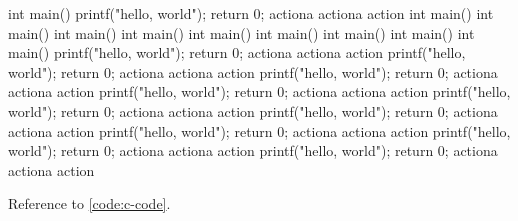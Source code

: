 \documentclass{article}
\newenvironment{codetitle}{\captionsetup{type=listing}}{}
\begin{document}
\begin{codetitle}
\label{code:c-code}
\begin{cppcode}
int main() {
printf("hello, world");
return 0;
actiona
actiona
action
}
int main() {
int main() {
int main() {
int main() {
int main() {
int main() {
int main() {
int main() {
int main() {
printf("hello, world");
return 0;
actiona
actiona
action
}
printf("hello, world");
return 0;
actiona
actiona
action
}
printf("hello, world");
return 0;
actiona
actiona
action
}
printf("hello, world");
return 0;
actiona
actiona
action
}
printf("hello, world");
return 0;
actiona
actiona
action
}
printf("hello, world");
return 0;
actiona
actiona
action
}
printf("hello, world");
return 0;
actiona
actiona
action
}
printf("hello, world");
return 0;
actiona
actiona
action
}
printf("hello, world");
return 0;
actiona
actiona
action
}
\end{cppcode}
\end{codetitle}

Reference to \ref{code:c-code}.  
\end{document}
